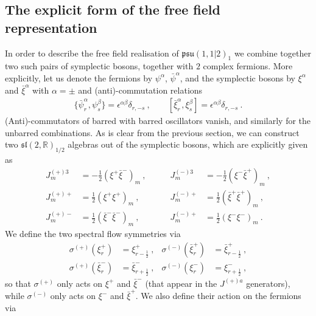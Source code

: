 \documentclass[12pt,a4paper]{article}
\begin{document}
\subsection{The explicit form of the free field representation} \label{subapp:free field realization explicit}

In order to describe the free field realisation of $\mathfrak{psu}(1,1|2)_1$ we combine together two such pairs of symplectic bosons, together with $2$ complex fermions. More explicitly, let us denote the fermions by $\psi^\alpha$, $\bar{\psi}^\alpha$, and the symplectic bosons by $\xi^\alpha$ and $\bar{\xi}^\alpha$ with $\alpha=\pm$ and (anti)-commutation relations
\begin{align}
\{\bar{\psi}^\alpha_r,\psi^\beta_s\}=\epsilon^{\alpha\beta} \delta_{r, -s}\ , \qquad [\bar{\xi}^\alpha_r,\xi^\beta_s]=\epsilon^{\alpha\beta} \delta_{r,-s}\ .
\end{align}
(Anti)-commutators of barred with barred oscillators vanish, and similarly for the unbarred combinations. As is clear from the previous section, we can  construct two $\mathfrak{sl}(2,\mathds{R})_{1/2}$ algebras out of the symplectic bosons, which are explicitly given as 
\begin{equation}\label{Jpm}
\begin{array}{rclrcl}
J^{(+)3}_m&=-\tfrac{1}{2} (\xi^+\bar{\xi}^-)_m \ , & \qquad J^{(-)3}_m&=-\tfrac{1}{2} (\xi^-\bar{\xi}^+)_m \ , \\[4pt]
J^{(+)+}_m&=\tfrac{1}{2}(\xi^+\xi^+)_m \ , & \qquad J^{(-)+}_m&=\tfrac{1}{2}(\bar{\xi}^+\bar{\xi}^+)_m \ , \\[4pt] 
J^{(+)-}_m&=\tfrac{1}{2}(\bar{\xi}^-\bar{\xi}^-)_m \ , & \qquad J^{(-)+}_m&=\tfrac{1}{2}(\xi^-\xi^-)_m \ .
\end{array}
\end{equation}
We define the two spectral flow symmetries via %
\begin{subequations}
\begin{align}
\sigma^{(+)} (\xi^+_r)&=\xi^+_{r-\frac{1}{2}}\ , & \sigma^{(-)} (\bar{\xi}^+_r)&=\bar{\xi}^+_{r-\frac{1}{2}}\ , \label{eq:spectral flow 1}\\
\sigma^{(+)} (\bar{\xi}^-_r)&=\bar{\xi}^-_{r+\frac{1}{2}}\ , & \sigma^{(-)} (\xi^-_r)&=\xi^-_{r+\frac{1}{2}}\ , \label{eq:spectral flow 2}
\end{align}
\end{subequations}
so that $\sigma^{(+)}$ only acts on $\xi^+$ and $\bar{\xi}^-$ (that appear in the $J^{(+)a}$ generators), while $\sigma^{(-)}$ only acts on $\xi^-$ and $\bar{\xi}^+$. We also define their action on the fermions via 
\end{document}
